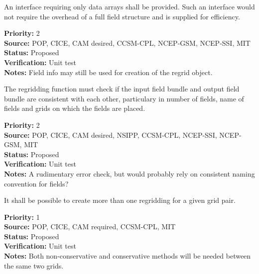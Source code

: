 An interface requiring only data arrays shall be
provided.  Such an interface would not require the overhead
of a full field structure and is supplied for efficiency.

\begin{reqlist}
{\bf Priority:} 2 \\
{\bf Source:} POP, CICE, CAM desired, CCSM-CPL, NCEP-GSM, NCEP-SSI, MIT \\
{\bf Status:} Proposed \\
{\bf Verification:} Unit test \\
{\bf Notes:} Field info may still be used for creation of the
             regrid object.
\end{reqlist}


The regridding function must check if the input field bundle and output field
bundle are consistent with each other, particulary in number of fields, name of
fields and grids on which the fields are placed.

\begin{reqlist}
{\bf Priority:} 2 \\
{\bf Source:} POP, CICE, CAM desired, NSIPP, CCSM-CPL, NCEP-SSI, NCEP-GSM, MIT \\
{\bf Status:} Proposed \\
{\bf Verification:} Unit test \\
{\bf Notes:} A rudimentary error check, but would probably rely on
             consistent naming convention for fields?
\end{reqlist}


It shall be possible to create more than one regridding for a given grid
pair.

\begin{reqlist}
{\bf Priority:} 1 \\
{\bf Source:} POP, CICE, CAM required, CCSM-CPL, MIT \\
{\bf Status:} Proposed \\
{\bf Verification:} Unit test \\
{\bf Notes:} Both non-conservative and conservative methods will be needed
             between the same two grids.
\end{reqlist}


